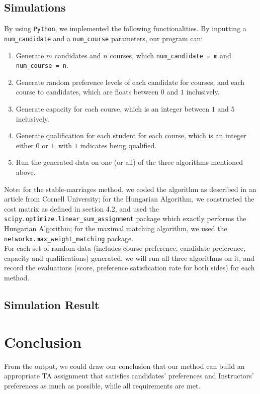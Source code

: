 \documentclass[twoside,twocolumn]{article}
\begin{document}
    \subsection{Simulations}
    By using \verb|Python|, we implemented the following functionalities. 
    By inputting a \verb|num_candidate| and a \verb|num_course| parameters, our program can:
    \begin{enumerate}
        \item Generate $m$ candidates and $n$ courses, which \verb|num_candidate = m| and \verb|num_course = n|.
        \item Generate random preference levels of each candidate for courses, and each course to candidates, which are
        floats between $0$ and $1$ inclusively.
        \item Generate capacity for each course, which is an integer between $1$ and $5$ inclusively.
        \item Generate qualification for each student for each course, which is an integer either $0$ or $1$, with $1$ indicates
        being qualified.
        \item Run the generated data on one (or all) of the three algorithms mentioned above.
    \end{enumerate}
    Note: for the stable-marriages method, we coded the algorithm as described in an article from Cornell University; for the Hungarian Algorithm, we
    constructed the cost matrix as defined in section 4.2, and used the \verb|scipy.optimize.linear_sum_assignment| package which exactly
    performs the Hungarian Algorithm; for the maximal matching algorithm, we used the \verb|networkx.max_weight_matching| package.
    \\ For each set of random data (includes course preference, candidate preference, capacity and qualifications) generated, we will run
    all three algorithms on it, and record the evaluations (score, preference satisfication rate for both sides) for each method.

    \subsection{Simulation Result}

    \section{Conclusion}
    \indent From the output, we could draw our conclusion that our method can build an appropriate TA assignment that satisfies candidates' preferences
    and Instructors' preferences as much as possible, while all requirements are met.
\end{document}
